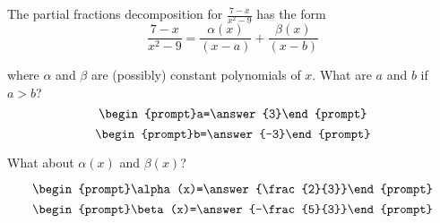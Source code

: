 \documentclass{ximera}
\author{Gregory Hartman \and Matthew Carr}
\begin{document}
\begin{exercise}




The partial fractions decomposition for $\frac{7-x}{x^2-9}$ has the form 
\[
\frac{7-x}{x^2-9}=\frac{\alpha(x)}{(x-a)}+\frac{\beta(x)}{(x-b)}
\]

where $\alpha$ and $\beta$ are (possibly) constant polynomials of $x$. What are $a$ and $b$ if $a>b$?
\[
\begin{prompt}a=\answer{3}\end{prompt}
\]
\[
\begin{prompt}b=\answer{-3}\end{prompt}
\]

What about $\alpha(x)$ and $\beta(x)$? 

\[
\begin{prompt}\alpha(x)=\answer{\frac{2}{3}}\end{prompt}
\]
\[
\begin{prompt}\beta(x)=\answer{-\frac{5}{3}}\end{prompt}
\]


\end{exercise}
\end{document}
